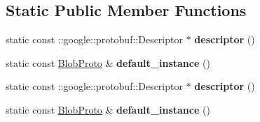 \subsection*{Static Public Member Functions}
\begin{DoxyCompactItemize}
\item 
\mbox{\label{classcaffe_1_1_blob_proto_a62308f236bda82154f550a6990bad234}} 
static const \+::google\+::protobuf\+::\+Descriptor $\ast$ {\bfseries descriptor} ()
\item 
\mbox{\label{classcaffe_1_1_blob_proto_a1189e3f8eb3e7cbdaa3537b91eca77f9}} 
static const \mbox{\hyperlink{classcaffe_1_1_blob_proto}{Blob\+Proto}} \& {\bfseries default\+\_\+instance} ()
\item 
\mbox{\label{classcaffe_1_1_blob_proto_abf451fe42ed7fe9fce74b874c4c38282}} 
static const \+::google\+::protobuf\+::\+Descriptor $\ast$ {\bfseries descriptor} ()
\item 
\mbox{\label{classcaffe_1_1_blob_proto_a6b6e593f00dacac22b8983158e4b1345}} 
static const \mbox{\hyperlink{classcaffe_1_1_blob_proto}{Blob\+Proto}} \& {\bfseries default\+\_\+instance} ()
\end{DoxyCompactItemize}
